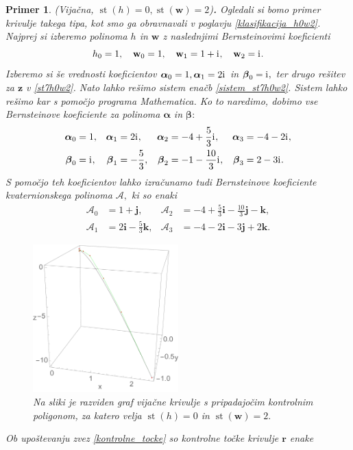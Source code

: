 \documentclass[12pt,a4paper,twoside]{article}
\newcommand{\iu}{\mathrm{i}\mkern1mu} %
\theoremstyle{definition} %
\theoremstyle{plain} %
\theoremstyle{primerstyle}
\newtheorem{primer}[definicija]{Primer}
\numberwithin{equation}{section}  %
\newcommand{\rV}{\mathbf{r}}
\newcommand{\iV}{\mathbf{i}}
\newcommand{\jV}{\mathbf{j}}
\newcommand{\kV}{\mathbf{k}}
\newcommand{\wV}{\mathbf{w}}
\newcommand{\zV}{\mathbf{z}}
\newcommand{\AQ}{\mathcal{A}}
\newcommand{\balpha}{\boldsymbol \alpha}
\newcommand{\bbeta}{\boldsymbol \beta}
\DeclareMathOperator{\st}{st}
\begin{document}
\begin{primer}
	\label{primer_h0w2_vijacna}
	\textnormal{ }(Vijačna, $\st(h)=0,\st(\wV)=2$)\textbf{.}
	Ogledali si bomo primer krivulje takega tipa, kot smo ga obravnavali v poglavju \ref{klasifikacija_h0w2}. Najprej si izberemo polinoma $h$ in $\wV$ z naslednjimi Bernsteinovimi koeficienti
	$$h_0=1,\quad\wV_0=1,\quad\wV_1=1+\iu,\quad\wV_2=\iu.$$
	Izberemo si še vrednosti koeficientov $\balpha_0=1,\balpha_1=2\iu$ in $\bbeta_0=\iu,$ ter drugo rešitev za $\zV$ v \eqref{st7h0w2}. Nato lahko rešimo sistem enačb \eqref{sistem_st7h0w2}. Sistem lahko rešimo kar s pomočjo programa \emph{Mathematica}. Ko to naredimo, dobimo vse Bernsteinove koeficiente za polinoma $\balpha$ in $\bbeta:$
	\begin{align*}
		\balpha_0&=1,&\balpha_1&=2\iu,&\balpha_2&=-4+\frac{5}{3}\iu,&\balpha_3&=-4-2\iu,\\
		\bbeta_0&=\iu,&\bbeta_1&=-\frac{5}{3},&\bbeta_2&=-1-\frac{10}{3}\iu,&\bbeta_3&=2-3\iu.
	\end{align*}
	S pomočjo teh koeficientov lahko izračunamo tudi Bernsteinove koeficiente kvaternionskega polinoma $\AQ,$ ki so enaki
	\begin{align*}
		\AQ_0&=1+\jV,&\AQ_2&=-4+\frac{5}{3}\iV-\frac{10}{3}\jV-\kV,\\
		\AQ_1&=2\iV-\frac{5}{3}\kV,&\AQ_3&=-4-2\iV-3\jV+2\kV.
	\end{align*}
	\begin{figure}[h]
	  \centering
	  \includegraphics[width=0.5\textwidth]{images/h0w2_vijacna.pdf}
	  \caption[Primer vijačne krivulje ($\st(h)=4,$ $\st(\wV)=0$)]{Na sliki je razviden graf vijačne krivulje s pripadajočim kontrolnim poligonom, za katero velja $\st(h)=0$ in $\st(\wV)=2.$}
	  \label{fig:h0w2_vijacna}
	\end{figure}
	Ob upoštevanju zvez \eqref{kontrolne_tocke} so kontrolne točke krivulje $\rV$ enake

\end{primer}
\end{document}
